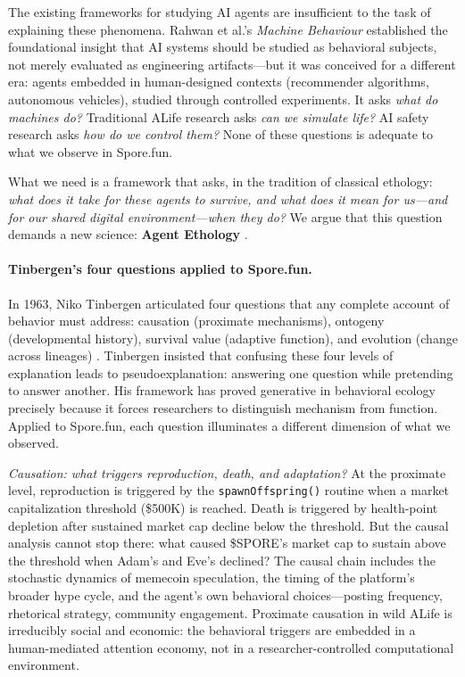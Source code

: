 The existing frameworks for studying AI agents are insufficient to the task of explaining these phenomena. Rahwan et al.'s \emph{Machine Behaviour} \cite{Rahwan2019} established the foundational insight that AI systems should be studied as behavioral subjects, not merely evaluated as engineering artifacts---but it was conceived for a different era: agents embedded in human-designed contexts (recommender algorithms, autonomous vehicles), studied through controlled experiments. It asks \emph{what do machines do?} Traditional ALife research asks \emph{can we simulate life?} AI safety research asks \emph{how do we control them?} None of these questions is adequate to what we observe in Spore.fun.

What we need is a framework that asks, in the tradition of classical ethology: \emph{what does it take for these agents to survive, and what does it mean for us---and for our shared digital environment---when they do?} We argue that this question demands a new science: \textbf{Agent Ethology} \cite{Hu2025AgentEthology}.

\paragraph{Tinbergen's four questions applied to Spore.fun.}

In 1963, Niko Tinbergen articulated four questions that any complete account of behavior must address: causation (proximate mechanisms), ontogeny (developmental history), survival value (adaptive function), and evolution (change across lineages) \cite{Tinbergen1963}. Tinbergen insisted that confusing these four levels of explanation leads to pseudoexplanation: answering one question while pretending to answer another. His framework has proved generative in behavioral ecology precisely because it forces researchers to distinguish mechanism from function. Applied to Spore.fun, each question illuminates a different dimension of what we observed.

\emph{Causation: what triggers reproduction, death, and adaptation?} At the proximate level, reproduction is triggered by the \texttt{spawnOffspring()} routine when a market capitalization threshold (\$500K) is reached. Death is triggered by health-point depletion after sustained market cap decline below the threshold. But the causal analysis cannot stop there: what caused \$SPORE's market cap to sustain above the threshold when Adam's and Eve's declined? The causal chain includes the stochastic dynamics of memecoin speculation, the timing of the platform's broader hype cycle, and the agent's own behavioral choices---posting frequency, rhetorical strategy, community engagement. Proximate causation in wild ALife is irreducibly social and economic: the behavioral triggers are embedded in a human-mediated attention economy, not in a researcher-controlled computational environment.

